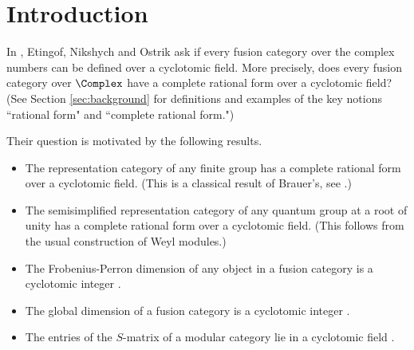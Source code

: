 \documentclass{gtart}
\begin{document}
\begin{abstract}
Etingof, Nikshych and Ostrik ask in \cite[\S 2]{MR2183279}  if every fusion category can be completely defined over a cyclotomic field.  We show that this is not the case: in particular one of the fusion categories coming from the Haagerup subfactor \cite{MR1686551} and one coming from the newly constructed extended Haagerup subfactor \cite{0909.4099} can not be completely defined over a cyclotomic field.    On the other hand, we show that the Drinfel'd center of the even part of the Haagerup subfactor is completely defined over a cyclotomic field.  We identify the minimal field of definition for each of these fusion categories, compute the Galois groups, and identify their Galois conjugates.
\end{abstract}

\maketitle


%

\section{Introduction}
In \cite[\S 2]{MR2183279}, Etingof, Nikshych and Ostrik ask if every fusion category over the complex numbers can be defined over a cyclotomic field.   More precisely, does every fusion category over $\Complex$ have a complete rational form over a cyclotomic field?  (See Section \ref{sec:background} for definitions and examples of the key notions ``rational form" and ``complete rational form.")

Their question is motivated by the following results.
\begin{itemize}
\item The representation category of any finite group has a complete rational form over a cyclotomic field. (This is a classical result of Brauer's, see \cite[\S 12.3]{MR0450380}.)
\item The semisimplified representation category of any quantum group at a root of unity has a complete rational form over a cyclotomic field.  (This follows from the usual construction of Weyl modules.)
\item The Frobenius-Perron dimension of any object in a fusion category is a cyclotomic integer \cite{MR2183279}.
\item The global dimension of a fusion category is a cyclotomic integer \cite{MR2183279}.
\item The entries of the $S$-matrix of a modular category lie in a cyclotomic field \cite{MR1266785, MR1120140}.
\end{itemize}
\end{document}
